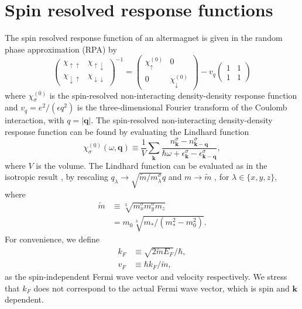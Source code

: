 \documentclass[aps,prb,reprint,twocolumns,superscriptaddress,nofootinbib]{revtex4-2}
\newcommand{\mdos}{\tilde{m}}
\newcommand{\kF}{k_{F}}
\begin{document}
	\section{Spin resolved response functions}
	The spin resolved response function of an altermagnet is given in the random phase approximation (RPA) by \cite{giulianiQuantumTheoryElectron2005}
	\begin{equation}
		\begin{pmatrix}
			\chi_{\uparrow\uparrow} & \chi_{\uparrow\downarrow} \\ 
			\chi_{\downarrow\uparrow} & \chi_{\downarrow\downarrow}
		\end{pmatrix}^{-1} = \begin{pmatrix}
			\chi_\uparrow^{(0)} & 0 \\
			0 & \chi_\downarrow^{(0)}
		\end{pmatrix}
		- v_q \begin{pmatrix}
			1 & 1 \\ 1 & 1 
		\end{pmatrix} \label{eq:chi-rpa}
	\end{equation}
	where $\chi_\sigma^{(0)}$ is the spin-resolved non-interacting density-density response function and $v_q=e^2 / (\epsilon q^2)$ is the three-dimensional Fourier transform of the Coulomb interaction, with $q=|\bm q|$. The spin-resolved non-interacting density-density response function can be found by evaluating the Lindhard function
	\begin{equation}
		\chi_\sigma^{(0)}(\omega,\bm q) \equiv \frac{1}{V} \sum_{\bm k} \frac{n_{\bm k}^\sigma - n_{\bm k-\bm q}^\sigma}{\hbar\omega + \epsilon_{\bm k}^\sigma - \epsilon_{\bm k-\bm q}^\sigma},
	\end{equation}
	where $V$ is the volume. The Lindhard function can be evaluated as in the isotropic result \cite{giulianiQuantumTheoryElectron2005}, by rescaling $q_\lambda\rightarrow \sqrt{\mdos/m_\lambda^\sigma} q$ and $m\rightarrow \mdos$ \cite{ahnAnisotropicFermionicQuasiparticles2021}, for $\lambda\in\{x,y,z\}$, 	 where
	\begin{align}
		\mdos&\equiv \sqrt[3]{m^\sigma_xm^\sigma_ym_z} \nonumber\\
		&=m_0\sqrt[3]{m_*/(m_*^2-m_0^2)}.
	\end{align}
	For convenience, we define 
	\begin{align}
		\kF&\equiv\sqrt{2\mdos E_F}/\hbar, \label{eq:kF} \\
		v_F&\equiv \hbar k_F/\mdos,
	\end{align}
	as the spin-independent Fermi wave vector and velocity respectively. We stress that $\kF$ does not correspond to the actual Fermi wave vector, which is spin and $\bm k$ dependent.
	
\end{document}
